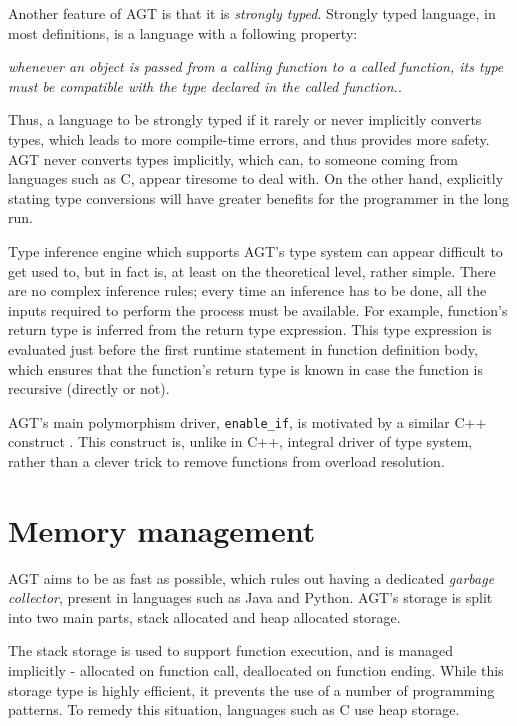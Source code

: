 \documentclass[times, utf8, diplomski]{fer}
\theoremstyle{definition}
\begin{document}
Another feature of AGT is that it is \textit{strongly typed}. 
Strongly typed language, in most definitions, is a language with a following property:
\begin{center}
    \textit{whenever an object is passed from a calling function 
    to a called function, its type must be compatible with 
    the type declared in the called function.}\citep{c_strong_typing}. 
\end{center}

Thus, a language to be strongly typed if it rarely or never implicitly converts
types, which leads to more compile-time errors, and thus provides
more safety. AGT never converts types implicitly,
which can, to someone coming from languages such as C, appear tiresome to deal with. On the other hand,
explicitly stating type conversions will have greater benefits for the
programmer in the long run.

Type inference engine which supports AGT's type system can appear difficult to
get used to, but in fact is, at least on the theoretical level, rather simple.
There are no complex inference rules;
every time an inference has to be done, all the inputs required to perform the process must be available.
For example, function's return type is inferred from the return type expression. 
This type expression is evaluated
just before the first runtime statement in function definition body, which
ensures that the function's return type is known in case the function is
recursive (directly or not).

AGT's main polymorphism driver, \texttt{enable\_if}, is motivated by a similar C++ construct
\citep{c_enable_if}. This construct is, unlike in C++, integral driver of type system,
rather than a clever trick to remove functions from overload resolution.

\section{Memory management}

AGT aims to be as fast as possible, which rules out having a dedicated \textit{garbage collector},
present in languages such as Java and Python. AGT's storage is split into two main parts,
stack allocated and heap allocated storage. 

The stack storage is used to support function
execution, and is managed implicitly - allocated on function call, deallocated on function ending.
While this storage type is highly efficient, it prevents the use of a number of programming patterns.
To remedy this situation, languages such as C use heap storage. 
\end{document}
